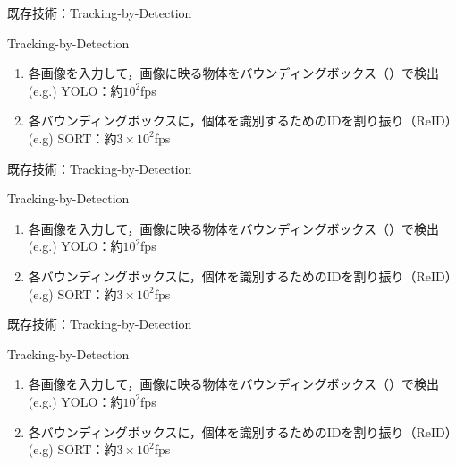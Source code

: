 \begin{frame}{既存技術：Tracking-by-Detection}
    \begin{block}{Tracking-by-Detection \cite{luo2021multiple}}
        \begin{enumerate}
            \item 各画像を入力して，画像に映る物体をバウンディングボックス（\red{$\square$}）で検出
            \\\ra (e.g.) YOLO：約$10^2$fps \cite{redmon2016you,wang2024yolov10}
            \item 各バウンディングボックスに，個体を識別するためのIDを割り振り（ReID）
            \\\ra (e.g) SORT：約$3\times10^2$fps \cite{bewley2016simple,wojke2017simple,du2023strongsort}
        \end{enumerate}        
    \end{block}
\end{frame}
\begin{frame}[noframenumbering]{既存技術：Tracking-by-Detection}
    \begin{block}{Tracking-by-Detection \cite{luo2021multiple}}
        \begin{enumerate}
            \item 各画像を入力して，画像に映る物体をバウンディングボックス（\red{$\square$}）で検出
            \\\ra (e.g.) YOLO：約$10^2$fps \cite{redmon2016you,wang2024yolov10}
            \item 各バウンディングボックスに，個体を識別するためのIDを割り振り（ReID）
            \\\ra (e.g) SORT：約$3\times10^2$fps \cite{bewley2016simple,wojke2017simple,du2023strongsort}
        \end{enumerate}        
    \end{block}
\end{frame}
\begin{frame}[noframenumbering]{既存技術：Tracking-by-Detection}
    \begin{block}{Tracking-by-Detection \cite{luo2021multiple}}
        \begin{enumerate}
            \item 各画像を入力して，画像に映る物体をバウンディングボックス（\red{$\square$}）で検出
            \\\ra (e.g.) YOLO：約$10^2$fps \cite{redmon2016you,wang2024yolov10}
            \item 各バウンディングボックスに，個体を識別するためのIDを割り振り（ReID）
            \\\ra (e.g) SORT：約$3\times10^2$fps \cite{bewley2016simple,wojke2017simple,du2023strongsort}
        \end{enumerate}        
    \end{block}
\end{frame}

